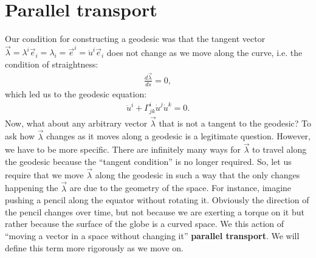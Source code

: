 \documentclass{book}
\theoremstyle{definition}
\begin{document}
\section{Parallel transport}
Our condition for constructing a geodesic was that the tangent vector $\vec{\lambda} = \lambda^i\vec{e}_i = \lambda_i = \vec{e}^i = \dot{u}^i\vec{e}_i$ does not change as we move along the curve, i.e. the condition of straightness:
\begin{align*}
\frac{d\vec{\lambda}}{ds} = 0,
\end{align*} 
which led us to the geodesic equation:
\begin{align*}
\ddot{u}^i + \Gamma^i_{jk}\dot{u}^j\dot{u}^k = 0.
\end{align*}
Now, what about any arbitrary vector $\vec{\lambda}$ that is not a tangent to the geodesic? To ask how $\vec{\lambda}$ changes as it moves along a geodesic is a legitimate question. However, we have to be more specific. There are infinitely many ways for $\vec{\lambda}$ to travel along the geodesic because the ``tangent condition'' is no longer required. So, let us require that we move $\vec{\lambda}$ along the geodesic in such a way that the only changes happening the $\vec{\lambda}$ are due to the geometry of the space. For instance, imagine pushing a pencil along the equator without rotating it. Obviously the direction of the pencil changes over time, but not because we are exerting a torque on it but rather because the surface of the globe is a curved space. We this action of ``moving a vector in a space without changing it'' \textbf{parallel transport}. We will define this term more rigorously as we move on. \\
\end{document}
